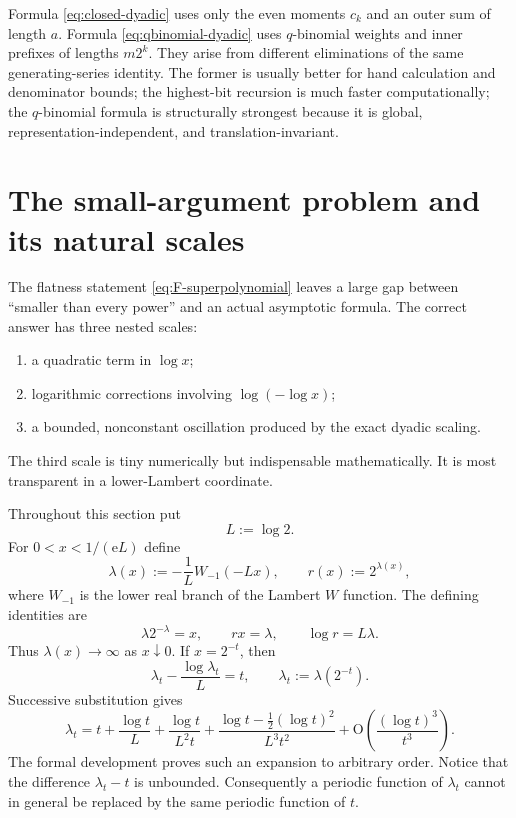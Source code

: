 \documentclass[11pt]{article}
\numberwithin{equation}{section}
\theoremstyle{definition}
\theoremstyle{remark}
\newcommand{\e}{\mathrm e}
\newcommand{\Oh}{\mathrm O}
\begin{document}
Formula \eqref{eq:closed-dyadic} uses only the even moments $c_k$ and an outer sum of length $a$.  Formula \eqref{eq:qbinomial-dyadic} uses $q$-binomial weights and inner prefixes of lengths $m2^k$.  They arise from different eliminations of the same generating-series identity.  The former is usually better for hand calculation and denominator bounds; the highest-bit recursion is much faster computationally; the $q$-binomial formula is structurally strongest because it is global, representation-independent, and translation-invariant.


\section{The small-argument problem and its natural scales}\label{sec:asymptotic}

The flatness statement \eqref{eq:F-superpolynomial} leaves a large gap between
``smaller than every power'' and an actual asymptotic formula.  The correct
answer has three nested scales:
\begin{enumerate}
\item a quadratic term in $\log x$;
\item logarithmic corrections involving $\log(-\log x)$;
\item a bounded, nonconstant oscillation produced by the exact dyadic scaling.
\end{enumerate}
The third scale is tiny numerically but indispensable mathematically.  It is
most transparent in a lower-Lambert coordinate.

Throughout this section put
\begin{equation}\label{eq:L-def}
 L:=\log 2.
\end{equation}
For $0<x<1/(\e L)$ define
\begin{equation}\label{eq:lambda-def}
 \lambda(x):=-\frac{1}{L}W_{-1}(-Lx),
 \qquad r(x):=2^{\lambda(x)},
\end{equation}
where $W_{-1}$ is the lower real branch of the Lambert $W$ function\cite{CorlessLambertW}.  The
defining identities are
\begin{equation}\label{eq:lambda-identities}
 \lambda 2^{-\lambda}=x,
 \qquad r x=\lambda,
 \qquad \log r=L\lambda.
\end{equation}
Thus $\lambda(x)\to\infty$ as $x\downarrow0$.  If $x=2^{-t}$, then
\begin{equation}\label{eq:lambda-dyadic-fixed-point}
 \lambda_t-\frac{\log\lambda_t}{L}=t,
 \qquad \lambda_t:=\lambda(2^{-t}).
\end{equation}
Successive substitution gives
\begin{equation}\label{eq:lambda-expansion}
 \lambda_t=t+\frac{\log t}{L}
 +\frac{\log t}{L^2t}
 +\frac{\log t-\tfrac12(\log t)^2}{L^3t^2}
 +\Oh\!\left(\frac{(\log t)^3}{t^3}\right).
\end{equation}
The formal development proves such an expansion to arbitrary order.  Notice
that the difference $\lambda_t-t$ is unbounded.  Consequently a periodic
function of $\lambda_t$ cannot in general be replaced by the same periodic
function of $t$.
\end{document}
